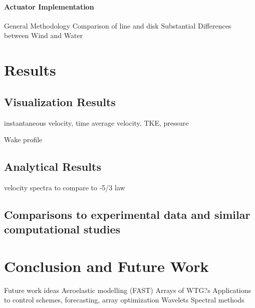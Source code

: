 \documentclass[12pt,letterpaper]{article}
\begin{document}
\paragraph{Actuator Implementation}

General Methodology
Comparison of line and disk
Substantial Differences between Wind and Water
\section{Results}

\subsection{Visualization Results}

instantaneous velocity, time average velocity, TKE, pressure

Wake profile

\subsection{Analytical Results}

velocity spectra to compare to -5/3 law

\subsection{Comparisons to experimental data and similar computational studies}

\section{Conclusion and Future Work}
Future work ideas
Aeroelastic modelling (FAST)
Arrays of WTG?s
Applications to control schemes, forecasting, array optimization
Wavelets
Spectral methods
\end{document}
